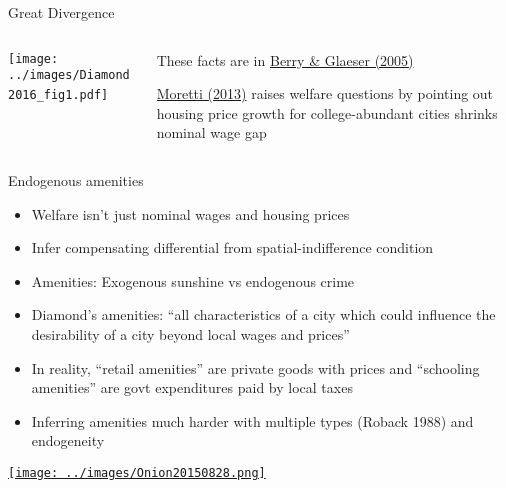 \documentclass[11pt,notes=hide,aspectratio=169]{beamer}
\begin{document}
\begin{frame}{Great Divergence}
\begin{columns}
\begin{column}{.60\textwidth}
\begin{center}
\texttt{[image: ../images/Diamond2016\_fig1.pdf]}\
\end{center}
\end{column}
\begin{column}{.38\textwidth}
\begin{itemize}
	\item 
\vspace{-4mm}
{\small
	These facts are in \href{https://onlinelibrary.wiley.com/doi/abs/10.1111/j.1435-5957.2005.00047.x}{Berry \& Glaeser (2005)} \\
	\item 
\href{https://www.aeaweb.org/articles?id=10.1257/app.5.1.65}{Moretti (2013)} raises welfare questions by pointing out housing price growth for college-abundant cities shrinks nominal wage gap\par
}
\end{itemize}
\end{column}
\end{columns}
\end{frame}
\begin{frame}{Endogenous amenities}
\begin{itemize}
	\item Welfare isn't just nominal wages and housing prices
	\item Infer compensating differential from spatial-indifference condition
	\item Amenities: Exogenous sunshine vs endogenous crime
	\item Diamond's amenities: ``all characteristics of a city which could influence the desirability of a city beyond local wages and prices''
	\item In reality, ``retail amenities'' are private goods with prices and ``schooling amenities'' are govt expenditures paid by local taxes
	\item Inferring amenities much harder with multiple types (Roback 1988) and endogeneity
\end{itemize}
\vspace{1mm}
\href{https://local.theonion.com/neighborhood-starting-to-get-too-safe-for-family-to-aff-1819578182}{\texttt{[image: ../images/Onion20150828.png]}}
\end{frame}
\end{document}
